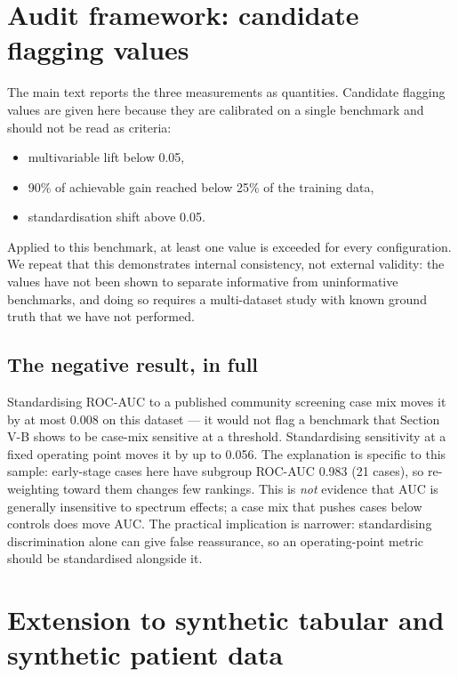 \documentclass[conference]{IEEEtran}
\begin{document}


\section{Audit framework: candidate flagging values}

The main text reports the three measurements as quantities. Candidate
flagging values are given here because they are calibrated on a single
benchmark and should not be read as criteria:

\begin{itemize}
  \item multivariable lift below 0.05,
  \item 90\% of achievable gain reached below 25\% of the training data,
  \item standardisation shift above 0.05.
\end{itemize}

Applied to this benchmark, at least one value is exceeded for every
configuration. We repeat that this demonstrates internal consistency, not
external validity: the values have not been shown to separate informative
from uninformative benchmarks, and doing so requires a multi-dataset study
with known ground truth that we have not performed.

\subsection{The negative result, in full}

Standardising ROC-AUC to a published community screening case mix moves it by
at most 0.008 on this dataset --- it would not flag a benchmark that Section
V-B shows to be case-mix sensitive at a threshold. Standardising sensitivity
at a fixed operating point moves it by up to 0.056. The explanation is
specific to this sample: early-stage cases here have subgroup ROC-AUC 0.983
(21 cases), so re-weighting toward them changes few rankings. This is
\emph{not} evidence that AUC is generally insensitive to spectrum effects; a
case mix that pushes cases below controls does move AUC. The practical
implication is narrower: standardising discrimination alone can give false
reassurance, so an operating-point metric should be standardised alongside
it.

\section{Extension to synthetic tabular and synthetic patient data}
\end{document}

